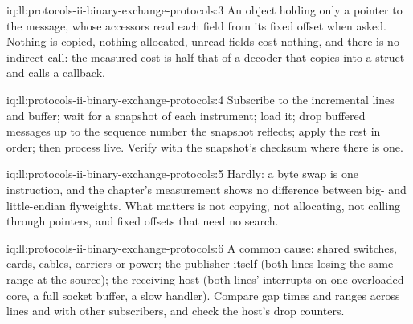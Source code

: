 \begin{solution}{iq:ll:protocols-ii-binary-exchange-protocols:3}
An object holding only a pointer to the message, whose accessors read each field from its fixed offset when asked. Nothing is
copied, nothing allocated, unread fields cost nothing, and there is no indirect call: the measured cost is half that of a
decoder that copies into a struct and calls a callback.
\end{solution}

\begin{solution}{iq:ll:protocols-ii-binary-exchange-protocols:4}
Subscribe to the incremental lines and buffer; wait for a snapshot of each instrument; load it; drop buffered messages up to
the sequence number the snapshot reflects; apply the rest in order; then process live. Verify with the snapshot's checksum where
there is one.
\end{solution}

\begin{solution}{iq:ll:protocols-ii-binary-exchange-protocols:5}
Hardly: a byte swap is one instruction, and the chapter's measurement shows no difference between big- and little-endian
flyweights. What matters is not copying, not allocating, not calling through pointers, and fixed offsets that need no search.
\end{solution}

\begin{solution}{iq:ll:protocols-ii-binary-exchange-protocols:6}
A common cause: shared switches, cards, cables, carriers or power; the publisher itself (both lines losing the same range at the
source); the receiving host (both lines' interrupts on one overloaded core, a full socket buffer, a slow handler). Compare gap
times and ranges across lines and with other subscribers, and check the host's drop counters.
\end{solution}
